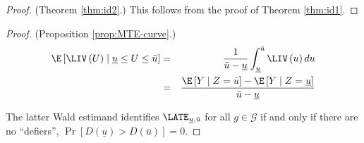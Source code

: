 \begin{proof}
(Theorem \ref{thm:id2}.) This follows from the proof of Theorem \ref{thm:id1}.
\end{proof}
\begin{proof}
(Proposition \ref{prop:MTE-curve}.)
\begin{eqnarray*}
\E\left[\LIV\left(U\right)\mid\underline{u}\leq U\leq\bar{u}\right] & = & \frac{1}{\bar{u}-\underline{u}}\int_{\underline{u}}^{\bar{u}}\LIV\left(u\right)du\\
 & = & \frac{\E\left[Y\mid Z=\bar{u}\right]-\E\left[Y\mid Z=\underline{u}\right]}{\bar{u}-\underline{u}}
\end{eqnarray*}

The latter Wald estimand identifies $\LATE_{\underline{u},\bar{u}}$
for all $g\in\mathcal{G}$ if and only if there are no ``defiers'',
$\Pr\left[D\left(\underline{u}\right)>D\left(\bar{u}\right)\right]=0$.
\end{proof}



